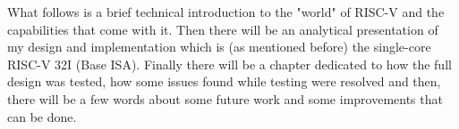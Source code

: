 	What follows is a brief technical introduction to the "world" of RISC-V and the capabilities that come with it. Then there will be an analytical presentation of my design and implementation which is (as mentioned before) the single-core RISC-V 32I (Base ISA). Finally there will be a chapter dedicated to how the full design was tested, how some issues found while testing were resolved and then, there will be a few words about some future work and some improvements that can be done.
	
	
	
	
	
	
%